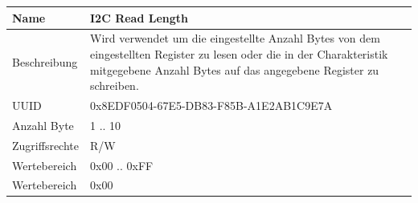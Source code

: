 \begin{tabularx}{\textwidth}{|l|X|}
\hline
Name & I2C Read Length                              \\
\hline
Beschreibung & Wird verwendet um die eingestellte Anzahl Bytes von dem eingestellten Register zu lesen oder die in der Charakteristik mitgegebene Anzahl Bytes auf das angegebene Register zu schreiben.\\
\hline
UUID	&    0x8EDF0504-67E5-DB83-F85B-A1E2AB1C9E7A \\
\hline     
Anzahl Byte	&    1 .. 10  \\
\hline      
Zugriffsrechte	&   R/W  \\
\hline        
Wertebereich	&   0x00 .. 0xFF \\
\hline          
Wertebereich	&   0x00 \\
\hline                                     
\end{tabularx}
